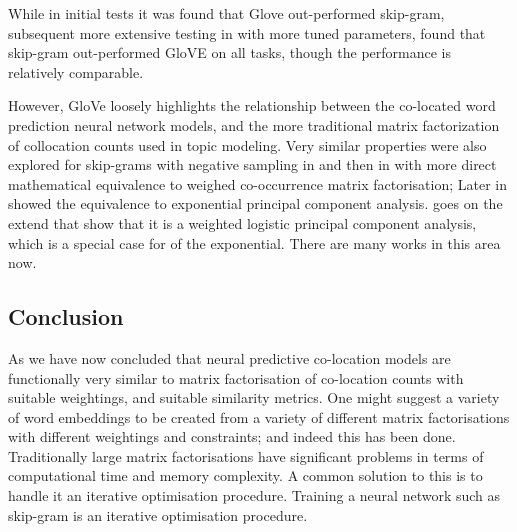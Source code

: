 \documentclass[parskip]{komatufte}
\begin{document}
While in initial tests it was found that Glove out-performed  skip-gram,
subsequent more extensive testing in  with more tuned parameters,
found that skip-gram out-performed GloVE on all tasks, though the performance is relatively comparable.




However, GloVe loosely highlights the relationship between the co-located word prediction neural network models,
and the more traditional matrix factorization of collocation counts used in topic modeling.
Very similar properties were also explored for skip-grams with negative sampling in  and then in  with more direct mathematical equivalence to weighed co-occurrence matrix factorisation;
Later in  showed the equivalence to exponential principal component analysis.
 goes on the extend that show that it is a weighted logistic principal component analysis, which is a special case for of the exponential.
There are many works in this area now.


\subsection{Conclusion}
As we have now concluded that neural predictive co-location models are functionally very similar to matrix factorisation of co-location counts with suitable weightings, and suitable similarity metrics.
One might suggest a variety of word embeddings to be created from a variety of different matrix factorisations with different weightings and constraints; and indeed this has been done.
Traditionally large matrix factorisations have significant problems in terms of computational time and memory complexity.
A common solution to this is to handle it an iterative optimisation procedure.
Training a neural network such as skip-gram is an iterative optimisation procedure.
\end{document}
